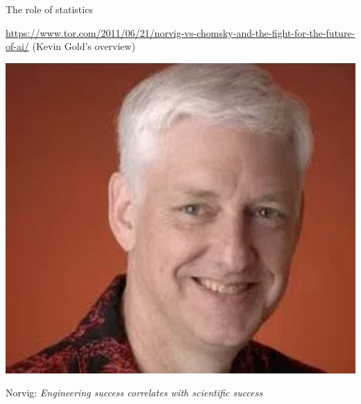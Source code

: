 \documentclass{beamer}
\begin{document}
\begin{frame}{The role of statistics}

  \begin{footnotesize}
    \url{https://www.tor.com/2011/06/21/norvig-vs-chomsky-and-the-fight-for-the-future-of-ai/} (Kevin Gold's overview)
  \end{footnotesize}

  \begin{center}
    \includegraphics[height=0.3\textheight]{figures/norvig}
  \end{center}

  Norvig: {\it Engineering success correlates with scientific success} 

\end{frame}
\end{document}
